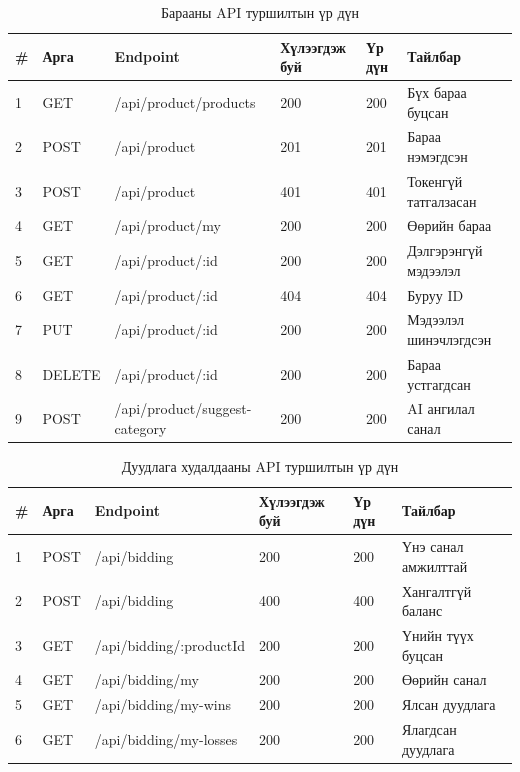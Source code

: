 \documentclass[12pt, a4paper]{report}
\begin{document}
\begin{table}[H]
  \centering
  \caption{Барааны API туршилтын үр дүн}
  \label{tab:product-api-test}
  \begin{tabularx}{\textwidth}{C{0.5cm}C{1.2cm}L{5cm}C{2cm}C{1.5cm}L{3.5cm}}
    \toprule
    \textbf{\#} & \textbf{Арга} & \textbf{Endpoint} & \textbf{Хүлээгдэж буй} & \textbf{Үр дүн} & \textbf{Тайлбар} \\
     & GET & /api/product/products & 200 & 200 & Бүх бараа буцсан \\
    2 & POST & /api/product & 201 & 201 & Бараа нэмэгдсэн \\
    3 & POST & /api/product & 401 & 401 & Токенгүй татгалзасан \\
    4 & GET & /api/product/my & 200 & 200 & Өөрийн бараа \\
    5 & GET & /api/product/:id & 200 & 200 & Дэлгэрэнгүй мэдээлэл \\
    6 & GET & /api/product/:id & 404 & 404 & Буруу ID \\
    7 & PUT & /api/product/:id & 200 & 200 & Мэдээлэл шинэчлэгдсэн \\
    8 & DELETE & /api/product/:id & 200 & 200 & Бараа устгагдсан \\
    9 & POST & /api/product/suggest-category & 200 & 200 & AI ангилал санал \\
    \bottomrule
  \end{tabularx}
\end{table}

\begin{table}[H]
  \centering
  \caption{Дуудлага худалдааны API туршилтын үр дүн}
  \label{tab:bid-api-test}
  \begin{tabularx}{\textwidth}{C{0.5cm}C{1.2cm}L{5cm}C{2cm}C{1.5cm}L{3.5cm}}
    \toprule
    \textbf{\#} & \textbf{Арга} & \textbf{Endpoint} & \textbf{Хүлээгдэж буй} & \textbf{Үр дүн} & \textbf{Тайлбар} \\
     & POST & /api/bidding & 200 & 200 & Үнэ санал амжилттай \\
    2 & POST & /api/bidding & 400 & 400 & Хангалтгүй баланс \\
    3 & GET & /api/bidding/:productId & 200 & 200 & Үнийн түүх буцсан \\
    4 & GET & /api/bidding/my & 200 & 200 & Өөрийн санал \\
    5 & GET & /api/bidding/my-wins & 200 & 200 & Ялсан дуудлага \\
    6 & GET & /api/bidding/my-losses & 200 & 200 & Ялагдсан дуудлага \\
    \bottomrule
  \end{tabularx}
\end{table}
\end{document}

